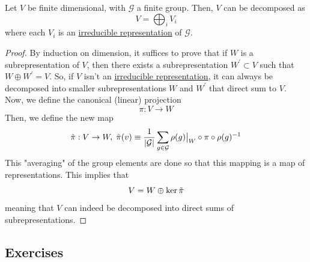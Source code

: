   \begin{theorem}
    \label{thm:maches-theorem}
    Let $V$ be finite dimensional, with $\mathcal{G}$ a finite group. Then, $V$ can be decomposed as 
    \begin{equation}
      V = \bigoplus_{i} V_i
    \end{equation}
    where each $V_i$ is an \hyperref[def:irreducible-representation]{irreducible representation} of $\mathcal{G}$. 
  \end{theorem}
  \begin{proof}
    By induction on dimension, it suffices to prove that if $W$ is a subrepresentation of $V$, then there exists a subrepresentation $W^\prime \subset V$ such that $W \oplus W^\prime = V$. So, if $V$ isn't an \hyperref[def:irreducible-representation]{irreducible representation}, it can always be decomposed into smaller subrepresentations $W$ and $W^\prime$ that direct sum to $V$. Now, we define the canonical (linear) projection 
    \begin{equation}
      \pi: V \to W
    \end{equation}
    Then, we define the new map 
    \begin{equation}
      \Tilde{\pi}: V \to W, \; \Tilde{\pi}(v) \equiv \frac{1}{|\mathcal{G}|} \sum_{g \in \mathcal{G}} \rho(g)\big|_W \circ \pi \circ \rho(g)^{-1}
    \end{equation}
    This "averaging" of the group elements are done so that this mapping is a map of representations. This implies that 
    \begin{equation}
      V = W \oplus \ker{\Tilde{\pi}}
    \end{equation}
    meaning that $V$ can indeed be decomposed into direct sums of subrepresentations. 
  \end{proof}

\subsection{Exercises}
